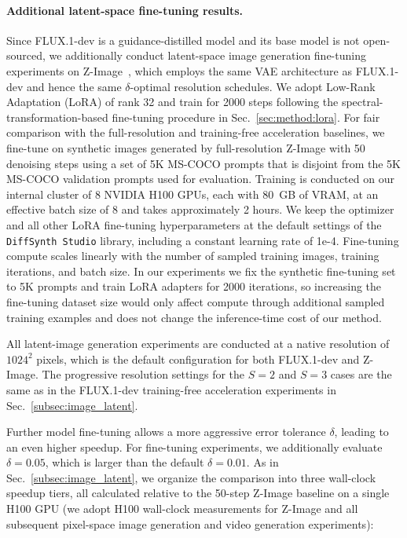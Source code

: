 \paragraph{Additional latent-space fine-tuning results.} Since FLUX.1-dev is a guidance-distilled model and its base model is not open-sourced, we additionally conduct latent-space image generation fine-tuning experiments on Z-Image~\citep{zimage}, which employs the same VAE architecture as FLUX.1-dev and hence the same $\delta$-optimal resolution schedules. We adopt Low-Rank Adaptation (LoRA) of rank 32 and train for 2000 steps following the spectral-transformation-based fine-tuning procedure in Sec.~\ref{sec:method:lora}. For fair comparison with the full-resolution and training-free acceleration baselines, we fine-tune on synthetic images generated by full-resolution Z-Image with 50 denoising steps using a set of 5K MS-COCO prompts that is disjoint from the 5K MS-COCO validation prompts used for evaluation. Training is conducted on our internal cluster of 8 NVIDIA H100 GPUs, each with 80~GB of VRAM, at an effective batch size of 8 and takes approximately 2 hours. We keep the optimizer and all other LoRA fine-tuning hyperparameters at the default settings of the \texttt{DiffSynth Studio} library, including a constant learning rate of 1e-4. Fine-tuning compute scales linearly with the number of sampled training images, training iterations, and batch size. In our experiments we fix the synthetic fine-tuning set to 5K prompts and train LoRA adapters for 2000 iterations, so increasing the fine-tuning dataset size would only affect compute through additional sampled training examples and does not change the inference-time cost of our method.

All latent-image generation experiments are conducted at a native resolution of $1024^2$ pixels, which is the default configuration for both FLUX.1-dev and Z-Image. The progressive resolution settings for the $S = 2$ and $S = 3$ cases are the same as in the FLUX.1-dev training-free acceleration experiments in Sec.~\ref{subsec:image_latent}.

Further model fine-tuning allows a more aggressive error tolerance $\delta$, leading to an even higher speedup. For fine-tuning experiments, we additionally evaluate $\delta=0.05$, which is larger than the default $\delta=0.01$. As in Sec.~\ref{subsec:image_latent}, we organize the comparison into three wall-clock speedup tiers, all calculated relative to the 50-step Z-Image baseline on a single H100 GPU (we adopt H100 wall-clock measurements for Z-Image and all subsequent pixel-space image generation and video generation experiments):

